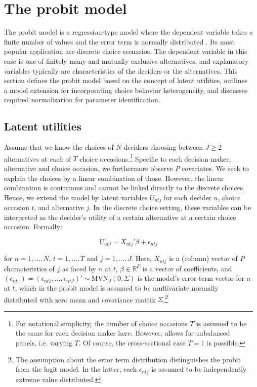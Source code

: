 \documentclass[article]{jss}
\begin{document}
\section{The probit model} \label{sec:probit_model}

The probit model is a regression-type model where the dependent variable takes a finite number of values and the error term is normally distributed \citep{Agresti:2015}. Its most popular application are discrete choice scenarios. The dependent variable in this case is one of finitely many and mutually exclusive alternatives, and explanatory variables typically are characteristics of the deciders or the alternatives. This section defines the probit model based on the concept of latent utilities, outlines a model extension for incorporating choice behavior heterogeneity, and discusses required normalization for parameter identification.

\subsection{Latent utilities} \label{subsec:latent_utilities}

Assume that we know the choices of $N$ deciders choosing between $J \geq 2$ alternatives at each of $T$ choice occasions.\footnote{For notational simplicity, the number of choice occasions $T$ is assumed to be the same for each decision maker here. However,  allows for unbalanced panels, i.e. varying $T$. Of course, the cross-sectional case $T = 1$ is possible.} Specific to each decision maker, alternative and choice occasion, we furthermore observe $P$ covariates. We seek to explain the choices by a linear combination of those. However, the linear combination is continuous and cannot be linked directly to the discrete choices. Hence, we extend the model by latent variables $U_{ntj}$ for each decider $n$, choice occasion $t$, and alternative $j$. In the discrete choice setting, these variables can be interpreted as the decider's utility of a certain alternative at a certain choice occasion. Formally:

\begin{equation}
  \label{eq:utility}
  U_{ntj} = X_{ntj}'\beta + \epsilon_{ntj}
\end{equation}

for $n=1,\dots,N$, $t=1,\dots,T$ and $j=1,\dots,J$. Here, $X_{ntj}$ is a (column) vector of $P$ characteristics of $j$ as faced by $n$ at $t$, $\beta \in {\mathbb R}^{P}$ is a vector of coefficients, and $(\epsilon_{nt:}) = (\epsilon_{nt1},\dots,\epsilon_{ntJ})' \sim \text{MVN}_{J} (0,\Sigma)$ is the model's error term vector for $n$ at $t$, which in the probit model is assumed to be multivariate normally distributed with zero mean and covariance matrix $\Sigma$.\footnote{The assumption about the error term distribution distinguishes the probit from the logit model. In the latter, each $\epsilon_{ntj}$ is assumed to be independently extreme value distributed.}
\end{document}
